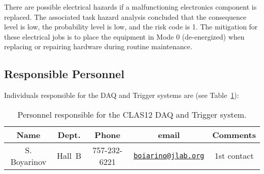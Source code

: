 There are possible electrical hazards if a malfunctioning electronics component is replaced. 
The associated task hazard analysis concluded that the consequence level is low, the 
probability level is low, and the risk code is 1. The mitigation for these electrical jobs is 
to place the equipment in Mode 0 (de-energized) when replacing or repairing hardware during 
routine maintenance.

\subsection{Responsible Personnel}

Individuals responsible for the DAQ and Trigger systems are (see Table~\ref{tb:daq}):

\begin{table}[!htb]
\centering
\begin{tabular}{|c|c|c|c|c|} \hline
Name&Dept.&Phone&email&Comments \\ \hline
S. Boyarinov&Hall~B&757-232-6221&\href{mailto:boiarino@jlab.org}{\nolinkurl{boiarino@jlab.org}}&1st contact \\ \hline
 \end{tabular}
\caption{Personnel responsible for the CLAS12 DAQ and Trigger system.} 
\label{tb:daq}
\end{table}

